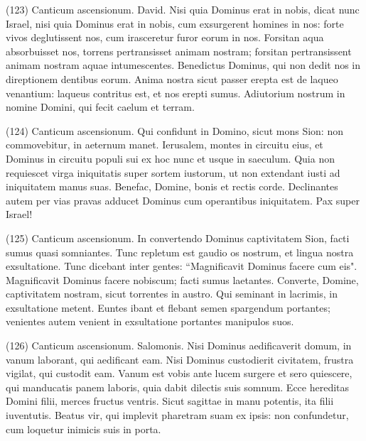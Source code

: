 \begin{biblechapter}  (123) 
\verse  Canticum ascensionum. David. Nisi quia Dominus erat in nobis, dicat nunc Israel, 
\verse nisi quia Dominus erat in nobis, cum exsurgerent homines in nos: 
\verse forte vivos deglutissent nos, cum irasceretur furor eorum in nos. 
\verse Forsitan aqua absorbuisset nos, torrens pertransisset animam nostram; 
\verse forsitan pertransissent animam nostram aquae intumescentes. 
\verse Benedictus Dominus, qui non dedit nos in direptionem dentibus eorum. 
\verse Anima nostra sicut passer erepta est de laqueo venantium: laqueus contritus est, et nos erepti sumus. 
\verse Adiutorium nostrum in nomine Domini, qui fecit caelum et terram. 
\end{biblechapter}

\begin{biblechapter}  (124) 
\verse  Canticum ascensionum. Qui confidunt in Domino, sicut mons Sion: non commovebitur, in aeternum manet. 
\verse Ierusalem, montes in circuitu eius, et Dominus in circuitu populi sui ex hoc nunc et usque in saeculum. 
\verse Quia non requiescet virga iniquitatis super sortem iustorum, ut non extendant iusti ad iniquitatem manus suas. 
\verse Benefac, Domine, bonis et rectis corde. 
\verse Declinantes autem per vias pravas adducet Dominus cum operantibus iniquitatem. Pax super Israel! 
\end{biblechapter}

\begin{biblechapter}  (125) 
\verse  Canticum ascensionum. In convertendo Dominus captivitatem Sion, facti sumus quasi somniantes. 
\verse Tunc repletum est gaudio os nostrum, et lingua nostra exsultatione. Tunc dicebant inter gentes: “Magnificavit Dominus facere cum eis". 
\verse Magnificavit Dominus facere nobiscum; facti sumus laetantes. 
\verse Converte, Domine, captivitatem nostram, sicut torrentes in austro. 
\verse Qui seminant in lacrimis, in exsultatione metent. 
\verse Euntes ibant et flebant semen spargendum portantes; venientes autem venient in exsultatione portantes manipulos suos. 
\end{biblechapter}

\begin{biblechapter}  (126) 
\verse  Canticum ascensionum. Salomonis. Nisi Dominus aedificaverit domum, in vanum laborant, qui aedificant eam. Nisi Dominus custodierit civitatem, frustra vigilat, qui custodit eam. 
\verse Vanum est vobis ante lucem surgere et sero quiescere, qui manducatis panem laboris, quia dabit dilectis suis somnum. 
\verse Ecce hereditas Domini filii, merces fructus ventris. 
\verse Sicut sagittae in manu potentis, ita filii iuventutis. 
\verse Beatus vir, qui implevit pharetram suam ex ipsis: non confundetur, cum loquetur inimicis suis in porta. 
\end{biblechapter}

